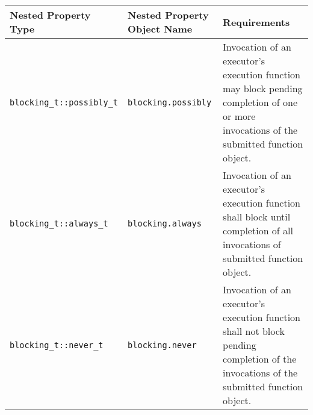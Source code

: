 \documentclass[a4paper,12pt,notitlepage,twoside,openright]{article}
\begin{document}
\begin{longtable}[]{@{}lll@{}}
\toprule
\begin{minipage}[b]{0.37\columnwidth}\raggedright
Nested Property Type\strut
\end{minipage} & \begin{minipage}[b]{0.34\columnwidth}\raggedright
Nested Property Object Name\strut
\end{minipage} & \begin{minipage}[b]{0.20\columnwidth}\raggedright
Requirements\strut
\end{minipage}\tabularnewline
\midrule
\endhead
\begin{minipage}[t]{0.37\columnwidth}\raggedright
\texttt{blocking_t::possibly_t}\strut
\end{minipage} & \begin{minipage}[t]{0.34\columnwidth}\raggedright
\texttt{blocking.possibly}\strut
\end{minipage} & \begin{minipage}[t]{0.20\columnwidth}\raggedright
Invocation of an executor's execution function may block pending
completion of one or more invocations of the submitted function
object.\strut
\end{minipage}\tabularnewline
\begin{minipage}[t]{0.37\columnwidth}\raggedright
\texttt{blocking_t::always_t}\strut
\end{minipage} & \begin{minipage}[t]{0.34\columnwidth}\raggedright
\texttt{blocking.always}\strut
\end{minipage} & \begin{minipage}[t]{0.20\columnwidth}\raggedright
Invocation of an executor's execution function shall block until
completion of all invocations of submitted function object.\strut
\end{minipage}\tabularnewline
\begin{minipage}[t]{0.37\columnwidth}\raggedright
\texttt{blocking_t::never_t}\strut
\end{minipage} & \begin{minipage}[t]{0.34\columnwidth}\raggedright
\texttt{blocking.never}\strut
\end{minipage} & \begin{minipage}[t]{0.20\columnwidth}\raggedright
Invocation of an executor's execution function shall not block pending
completion of the invocations of the submitted function object.\strut
\end{minipage}\tabularnewline
\bottomrule
\end{longtable}
\end{document}
